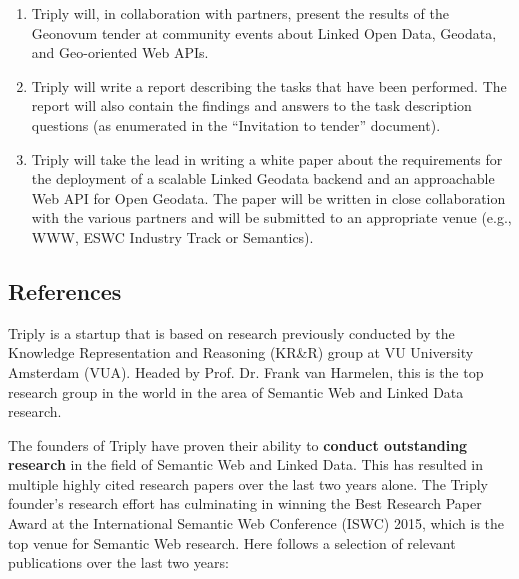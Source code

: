 \documentclass[a4paper]{scrartcl}
\begin{document}
\begin{enumerate}
  
\item Triply will, in collaboration with partners, present the results
  of the Geonovum tender at community events about Linked Open Data,
  Geodata, and Geo-oriented Web APIs.
  
\item Triply will write a report describing the tasks that have been
  performed.  The report will also contain the findings and answers to
  the task description questions (as enumerated in the ``Invitation to
  tender'' document).

\item Triply will take the lead in writing a white paper about the
  requirements for the deployment of a scalable Linked Geodata backend
  and an approachable Web API for Open Geodata.  The paper will be
  written in close collaboration with the various partners and will be
  submitted to an appropriate venue (e.g., WWW, ESWC Industry Track or
  Semantics).
  
\end{enumerate}


\subsection{References}

Triply is a startup that is based on research previously conducted by
the Knowledge Representation and Reasoning (KR\&R) group at VU
University Amsterdam (VUA).  Headed by Prof. Dr. Frank van Harmelen,
this is the top research group in the world in the area of Semantic
Web and Linked Data research.

The founders of Triply have proven their ability to \textbf{conduct
  outstanding research} in the field of Semantic Web and Linked Data.
This has resulted in multiple highly cited research papers over the
last two years alone.  The Triply founder's research effort has
culminating in winning the Best Research Paper Award at the
International Semantic Web Conference (ISWC) 2015, which is the top
venue for Semantic Web research.  Here follows a selection of relevant
publications over the last two years:
\end{document}
